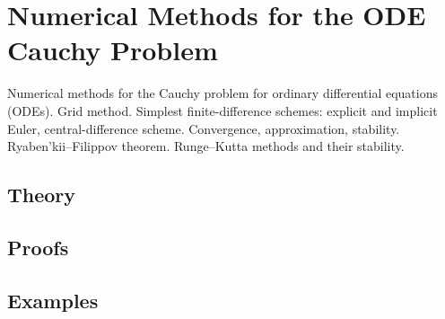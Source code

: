 
\section{Numerical Methods for the ODE Cauchy Problem}
\label{sec:2.1.11-ode-cauchy}

\begin{ticket}
Numerical methods for the Cauchy problem for ordinary differential equations (ODEs). Grid method. Simplest finite-difference schemes: explicit and implicit Euler, central-difference scheme. Convergence, approximation, stability. Ryaben'kii–Filippov theorem. Runge–Kutta methods and their stability.
\end{ticket}

\subsection*{Theory}

\subsection*{Proofs}

\subsection*{Examples}
